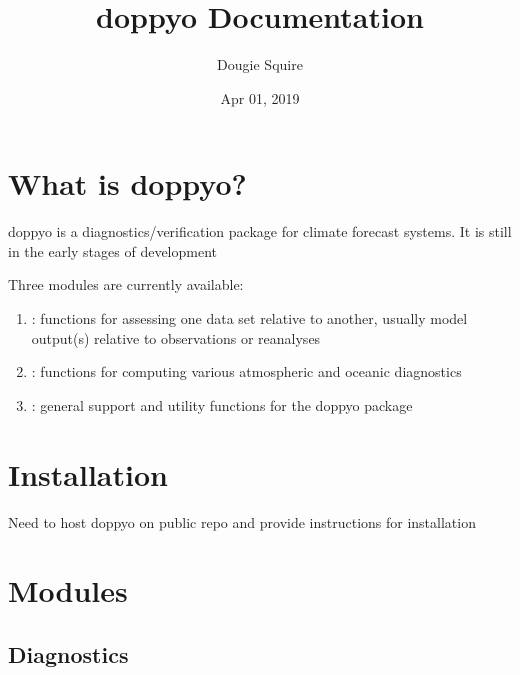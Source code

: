 \documentclass[letterpaper,10pt,english]{sphinxmanual}
\title{doppyo Documentation}
\date{Apr 01, 2019}
\author{Dougie Squire}
\begin{document}
\pagestyle{empty}
\sphinxmaketitle
\pagestyle{plain}
\sphinxtableofcontents
\pagestyle{normal}
\label{\detokenize{index::doc}}



\chapter{What is doppyo?}
\label{\detokenize{overview_doc:what-is-doppyo}}\label{\detokenize{overview_doc::doc}}
doppyo is a diagnostics/verification package for climate forecast systems. It is still in the early stages of development

Three modules are currently available:
\begin{enumerate}
\def\theenumi{\arabic{enumi}}
\def\labelenumi{\theenumi .}
\makeatletter\def\p@enumii{\p@enumi \theenumi .}\makeatother
\item {} 
 : functions for assessing one data set relative to another, usually model output(s) relative to observations or reanalyses

\item {} 
 : functions for computing various atmospheric and oceanic diagnostics

\item {} 
 : general support and utility functions for the doppyo package

\end{enumerate}


\chapter{Installation}
\label{\detokenize{installation_doc:installation}}\label{\detokenize{installation_doc::doc}}
Need to host doppyo on public repo and provide instructions for installation


\chapter{Modules}
\label{\detokenize{modules_doc:modules}}\label{\detokenize{modules_doc::doc}}

\section{Diagnostics}
\label{\detokenize{diagnostic_doc:module-diagnostic}}\label{\detokenize{diagnostic_doc:diagnostics}}\label{\detokenize{diagnostic_doc::doc}}
\end{document}
